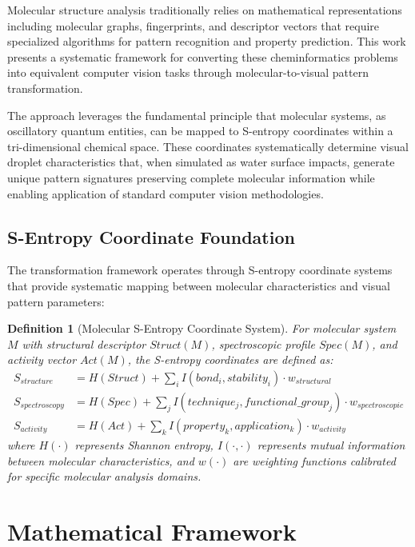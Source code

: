 \documentclass[12pt,a4paper]{article}
\newtheorem{definition}{Definition}
\begin{document}
Molecular structure analysis traditionally relies on mathematical representations including molecular graphs, fingerprints, and descriptor vectors that require specialized algorithms for pattern recognition and property prediction. This work presents a systematic framework for converting these cheminformatics problems into equivalent computer vision tasks through molecular-to-visual pattern transformation.

The approach leverages the fundamental principle that molecular systems, as oscillatory quantum entities, can be mapped to S-entropy coordinates within a tri-dimensional chemical space. These coordinates systematically determine visual droplet characteristics that, when simulated as water surface impacts, generate unique pattern signatures preserving complete molecular information while enabling application of standard computer vision methodologies.

\subsection{S-Entropy Coordinate Foundation}

The transformation framework operates through S-entropy coordinate systems that provide systematic mapping between molecular characteristics and visual pattern parameters:

\begin{definition}[Molecular S-Entropy Coordinate System]
For molecular system $M$ with structural descriptor $Struct(M)$, spectroscopic profile $Spec(M)$, and activity vector $Act(M)$, the S-entropy coordinates are defined as:
\begin{align}
S_{structure} &= H(Struct) + \sum_{i} I(bond_i, stability_i) \cdot w_{structural} \\
S_{spectroscopy} &= H(Spec) + \sum_{j} I(technique_j, functional\_group_j) \cdot w_{spectroscopic} \\
S_{activity} &= H(Act) + \sum_{k} I(property_k, application_k) \cdot w_{activity}
\end{align}
where $H(\cdot)$ represents Shannon entropy, $I(\cdot,\cdot)$ represents mutual information between molecular characteristics, and $w(\cdot)$ are weighting functions calibrated for specific molecular analysis domains.
\end{definition}

\section{Mathematical Framework}
\end{document}
